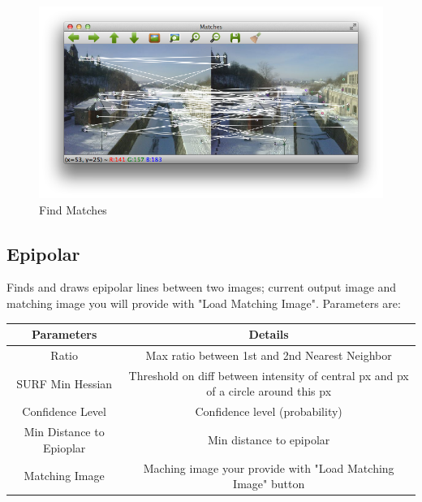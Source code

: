 \documentclass{article}
\begin{document}
\begin{figure}[H]
\begin{center}
\includegraphics[scale=0.5]{toolboxFindMatches.png}
\caption{Find Matches}
\end{center}
\end{figure}	   

\subsection{Epipolar}
Finds and draws epipolar lines between two images; current output image and matching image you will provide with "Load Matching Image". Parameters are:

\begin{table}[H]
\begin{center}
\begin{tabular}{|c|c|l|l|l|}
\hline
\textbf{Parameters}      & \multicolumn{4}{|c|}{\textbf{Details}}                                                                    \\ \hline
Ratio                    & \multicolumn{4}{|c|}{Max ratio between 1st and 2nd Nearest Neighbor}                                      \\ \hline
SURF Min Hessian         & \multicolumn{4}{|c|}{Threshold on diff between intensity of central px and px of a circle around this px} \\ \hline
Confidence Level         & \multicolumn{4}{|c|}{Confidence level (probability)}                                                      \\ \hline
Min Distance to Epioplar & \multicolumn{4}{|c|}{Min distance to epipolar}                                                            \\ \hline
Matching Image           & \multicolumn{4}{|c|}{Maching image your provide with "Load Matching Image" button}                        \\ \hline
\end{tabular}
\end{center}
\end{table}
\end{document}
